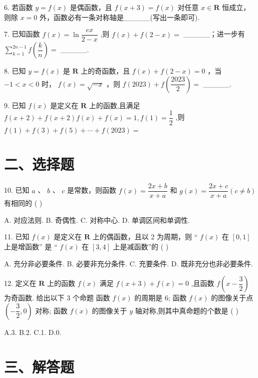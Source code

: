 6. 若函数 $y = f\left( x\right)$ 是偶函数，且 $f\left( {x + 3}\right)  = f\left( x\right)$ 对任意 $x \in  \mathbf{R}$ 恒成立，则除 $x = 0$ 外，函数必有一条对称轴是\_\_\_\_\_(写出一条即可).

7. 已知函数 $f\left( x\right)  = \ln \dfrac{ex}{2 - x}$ ,则 $f\left( x\right)  + f\left( {2 - x}\right)  =$ \_\_\_\_\_；进一步有 $\mathop{\sum }\limits_{{k = 1}}^{{{2n} - 1}}f\left( \dfrac{k}{n}\right)  =$ \_\_\_\_\_.

8. 已知 $y = f\left( x\right)$ 是 $\mathbf{R}$ 上的奇函数，且 $f\left( x\right)  + f\left( {2 - x}\right)  = 0$ ，当 $- 1 < x < 0$ 时， $f\left( x\right)  = \sqrt{-x}$ ，则 $f\left( {2023}\right)  + f\left( \dfrac{2023}{2}\right)  =$ \_\_\_\_\_.

9. 已知 $f\left( x\right)$ 是定义在 $\mathbf{R}$ 上的函数,且满足 $f\left( {x + 2}\right)  + f\left( {x + 2}\right) f\left( x\right)  + f\left( x\right)  = 1,f\left( 1\right)  = \dfrac{1}{2}$ ,则 $f\left( 1\right)  +  f\left( 3\right)  + f\left( 5\right)  + \cdots  + f\left( {2023}\right)  =$

\section*{二、选择题}

10. 已知 $a$ 、 $b$ 、 $c$ 是常数，则函数 $f\left( x\right)  = \dfrac{{2x} + b}{x + a}$ 和 $g\left( x\right)  = \dfrac{{2x} + c}{x + a}\left( {c \neq  b}\right)$ 有相同的 ( )

A. 对应法则. B. 奇偶性. C. 对称中心. D. 单调区间和单调性.

11. 已知 $f\left( x\right)$ 是定义在 $\mathbf{R}$ 上的偶函数，且以 2 为周期，则 “ $f\left( x\right)$ 在 $\left\lbrack  {0,1}\right\rbrack$ 上是增函数” 是 “ $f\left( x\right)$ 在 $\left\lbrack  {3,4}\right\rbrack$ 上是减函数”的 ( )

A. 充分非必要条件. B. 必要非充分条件. C. 充要条件. D. 既非充分也非必要条件.

12. 定义在 $\mathbf{R}$ 上的函数 $f\left( x\right)$ 满足 $f\left( {x + 3}\right)  + f\left( x\right)  = 0$ ,且函数 $f\left( {x - \dfrac{3}{2}}\right)$ 为奇函数. 给出以下 3 个命题   函数 $f\left( x\right)$ 的周期是 6;   函数 $f\left( x\right)$ 的图像关于点 $\left( {-\dfrac{3}{2},0}\right)$ 对称;   函数 $f\left( x\right)$ 的图像关于 $y$ 轴对称,则其中真命题的个数是 ( )

A.3. B.2. C.1. D.0.

\section*{三、解答题}

